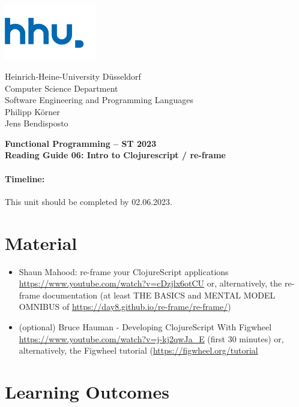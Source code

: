 \documentclass[11pt,a4paper]{article}
\begin{document}
\begin{minipage}[b]{\textwidth}
	\parbox[t]{5cm}{%
		\includegraphics[width=4cm]{unilogo}
		\hfill
	}
	\parbox[b]{11cm}{%
		Heinrich-Heine-University D\"usseldorf\\
		Computer Science Department\\
		Software Engineering and Programming Languages\\
		Philipp K\"orner \\
        Jens Bendisposto
	}
\end{minipage}
\begin{center}
	\bf
	Functional Programming -- ST 2023\\
    Reading Guide 06: Intro to Clojurescript / re-frame
\end{center}

\pagestyle{empty}

\paragraph{Timeline:} This unit should be completed by 02.06.2023.

\section{Material} 

\renewcommand{\labelenumi}{\Alph{enumi}}
\begin{itemize}    
    \item Shaun Mahood: re-frame your ClojureScript applications \url{https://www.youtube.com/watch?v=cDzjlx6otCU}
        or, alternatively,  the re-frame documentation (at least THE BASICS and MENTAL MODEL OMNIBUS of \url{https://day8.github.io/re-frame/re-frame/})
    \item (optional) Bruce Hauman - Developing ClojureScript With Figwheel \url{https://www.youtube.com/watch?v=j-kj2qwJa_E} (first 30 minutes)
        or, alternatively,  the Figwheel tutorial (\url{https://figwheel.org/tutorial}
\end{itemize} 

\section{Learning Outcomes}
\end{document}
